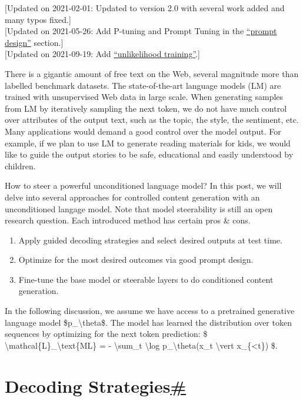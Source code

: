 {{[}Updated on 2021-02-01: Updated to version 2.0 with several work added and many typos fixed.{]}}\\
{{[}Updated on 2021-05-26: Add P-tuning and Prompt Tuning in the \hyperref[gradient-based-search]{``prompt design''} section.{]}}\\
{{[}Updated on 2021-09-19: Add \hyperref[ux5cux23unlikelihood-training]{``unlikelihood training''}.{]}}

There is a gigantic amount of free text on the Web, several magnitude more than labelled benchmark datasets. The state-of-the-art language models (LM) are trained with unsupervised Web data in large scale. When generating samples from LM by iteratively sampling the next token, we do not have much control over attributes of the output text, such as the topic, the style, the sentiment, etc. Many applications would demand a good control over the model output. For example, if we plan to use LM to generate reading materials for kids, we would like to guide the output stories to be safe, educational and easily understood by children.

How to steer a powerful unconditioned language model? In this post, we will delve into several approaches for controlled content generation with an unconditioned langage model. Note that model steerability is still an open research question. Each introduced method has certain pros \& cons.

\begin{enumerate}
\tightlist
\item
  Apply guided decoding strategies and select desired outputs at test time.
\item
  Optimize for the most desired outcomes via good prompt design.
\item
  Fine-tune the base model or steerable layers to do conditioned content generation.
\end{enumerate}

In the following discussion, we assume we have access to a pretrained generative language model \$p\_\textbackslash theta\$. The model has learned the distribution over token sequences by optimizing for the next token prediction: \$ \textbackslash mathcal\{L\}\_\textbackslash text\{ML\} = - \textbackslash sum\_t \textbackslash log p\_\textbackslash theta(x\_t \textbackslash vert x\_\{\textless t\}) \$.

\section{\texorpdfstring{Decoding Strategies\hyperref[decoding-strategies]{\#}}{Decoding Strategies\#}}\label{decoding-strategies}

